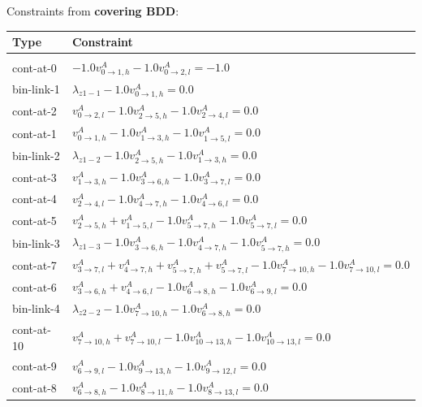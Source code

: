 \documentclass[11pt]{article}
\begin{document}
\newpage Constraints from \textbf{covering BDD}:\\

\begin{tabular}{l l}
\textbf{Type} & \textbf{Constraint}\\\hline\\
    cont-at-0 & $-1.0 v^A_{0 \rightarrow 1, h} -1.0 v^A_{0 \rightarrow 2, l} = -1.0$\\
    bin-link-1 & $\lambda_{z1-1} -1.0 v^A_{0 \rightarrow 1, h} = 0.0$\\
    cont-at-2 & $v^A_{0 \rightarrow 2, l} -1.0 v^A_{2 \rightarrow 5, h} -1.0 v^A_{2 \rightarrow 4, l} = 0.0$\\
    cont-at-1 & $v^A_{0 \rightarrow 1, h} -1.0 v^A_{1 \rightarrow 3, h} -1.0 v^A_{1 \rightarrow 5, l} = 0.0$\\
    bin-link-2 & $\lambda_{z1-2} -1.0 v^A_{2 \rightarrow 5, h} -1.0 v^A_{1 \rightarrow 3, h} = 0.0$\\
    cont-at-3 & $v^A_{1 \rightarrow 3, h} -1.0 v^A_{3 \rightarrow 6, h} -1.0 v^A_{3 \rightarrow 7, l} = 0.0$\\
    cont-at-4 & $v^A_{2 \rightarrow 4, l} -1.0 v^A_{4 \rightarrow 7, h} -1.0 v^A_{4 \rightarrow 6, l} = 0.0$\\
    cont-at-5 & $v^A_{2 \rightarrow 5, h} + v^A_{1 \rightarrow 5, l} -1.0 v^A_{5 \rightarrow 7, h} -1.0 v^A_{5 \rightarrow 7, l} = 0.0$\\
    bin-link-3 & $\lambda_{z1-3} -1.0 v^A_{3 \rightarrow 6, h} -1.0 v^A_{4 \rightarrow 7, h} -1.0 v^A_{5 \rightarrow 7, h} = 0.0$\\
    cont-at-7 & $v^A_{3 \rightarrow 7, l} + v^A_{4 \rightarrow 7, h} + v^A_{5 \rightarrow 7, h} + v^A_{5 \rightarrow 7, l} -1.0 v^A_{7 \rightarrow 10, h} -1.0 v^A_{7 \rightarrow 10, l} = 0.0$\\
    cont-at-6 & $v^A_{3 \rightarrow 6, h} + v^A_{4 \rightarrow 6, l} -1.0 v^A_{6 \rightarrow 8, h} -1.0 v^A_{6 \rightarrow 9, l} = 0.0$\\
    bin-link-4 & $\lambda_{z2-2} -1.0 v^A_{7 \rightarrow 10, h} -1.0 v^A_{6 \rightarrow 8, h} = 0.0$\\
    cont-at-10 & $v^A_{7 \rightarrow 10, h} + v^A_{7 \rightarrow 10, l} -1.0 v^A_{10 \rightarrow 13, h} -1.0 v^A_{10 \rightarrow 13, l} = 0.0$\\
    cont-at-9 & $v^A_{6 \rightarrow 9, l} -1.0 v^A_{9 \rightarrow 13, h} -1.0 v^A_{9 \rightarrow 12, l} = 0.0$\\
    cont-at-8 & $v^A_{6 \rightarrow 8, h} -1.0 v^A_{8 \rightarrow 11, h} -1.0 v^A_{8 \rightarrow 13, l} = 0.0$\\

\end{tabular}
\end{document}
